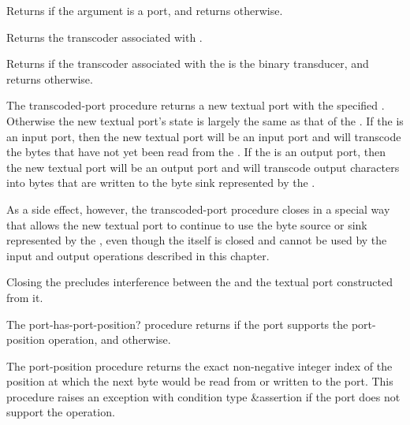 \begin{entry}{%
}
   
Returns \schtrue{} if the argument is a port, and returns \schfalse{}
otherwise.
\end{entry}

\begin{entry}{%
}

Returns the transcoder associated with .
\end{entry}

\begin{entry}{%
}

Returns \schtrue{} if the transcoder associated with the 
is the binary transducer, and returns \schfalse{} otherwise.
\end{entry}

\begin{entry}{%
}

The {\cf transcoded-port} procedure
returns a new textual port with the specified .
Otherwise the new textual port's state is largely the same as
that of the .
If the  is an input port, then the new textual
port will be an input port and
will transcode the bytes that have not yet been read from
the .
If the  is an output port, then the new textual
port will be an output port and
will transcode output characters into bytes that are
written to the byte sink represented by the .

As a side effect, however, the {\cf transcoded-port} procedure
closes  in
a special way that allows the new textual port to continue to
use the byte source or sink represented by the ,
even though the  itself is closed and cannot
be used by the input and output operations described in this
chapter.

\begin{rationale}
Closing the  precludes interference between
the  and the textual port constructed from it.
\end{rationale}
\end{entry}

\begin{entry}{%
}

The {\cf port-has-port-position?} procedure returns \schtrue{} if the
port supports the {\cf port-position} operation, and \schfalse{}
otherwise.

The {\cf port-position} procedure
returns the exact non-negative integer index of the position at which the
next byte would be read from or written to the port.
This procedure raises an exception with condition type {\cf\&assertion}
if the port does not support the operation.
\end{entry}   

